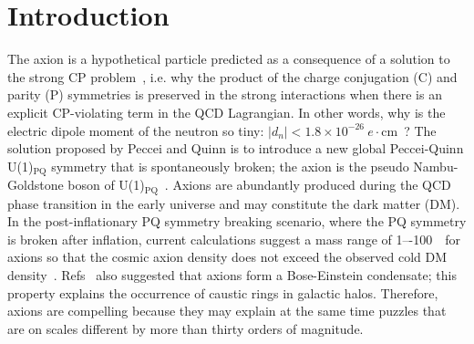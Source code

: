 \section{Introduction} \label{sec:intro}
The axion is a hypothetical particle predicted as a consequence of a  
solution to the strong CP problem~\cite{strongCPI,strongCPII,strongCPIII}, 
i.e. why the product of the charge 
conjugation (C) and parity (P) symmetries is preserved in the strong 
interactions when there is an explicit CP-violating term in the QCD 
Lagrangian. In other words, why is the electric dipole moment 
of the neutron so tiny:  
$\left|d_n\right| < 1.8 \times10^{-26}~e\cdot\mathrm{cm}$~\cite{EDM,PDG}? 
The solution proposed by Peccei and Quinn is to introduce a new global 
Peccei-Quinn U(1)$_\mathrm{PQ}$ symmetry that is spontaneously broken; the 
axion is the pseudo Nambu-Goldstone boson of 
U(1)$_\mathrm{PQ}$~\cite{strongCPI}. 
Axions are abundantly produced during the QCD phase transition in 
the early universe and may constitute the dark matter (DM). 
In the post-inflationary PQ symmetry breaking scenario, where the PQ symmetry
is broken after inflation, current calculations suggest a mass range of 
1–-100~\muevcc\ for axions so that the cosmic axion density does not exceed 
the 
observed cold DM density~\cite{QCDCalI,QCDCalII,QCDCalIII,QCDCalIV,QCDCalV,QCDCalVI,QCDCalVII,QCDCalVIII,QCDCalIX,QCDCalX,QCDCalXI,QCDCalXII,QCDCalXIII}. 
Refs~\cite{axionDMI,axionDMII,axionDMIII} also suggested that axions form a 
Bose-Einstein condensate; this property explains the occurrence of 
caustic rings in galactic halos. Therefore, axions are compelling because 
they may explain at the same 
time puzzles that are on scales different by more than thirty orders of 
magnitude. 


%
%
%

%
%
%

